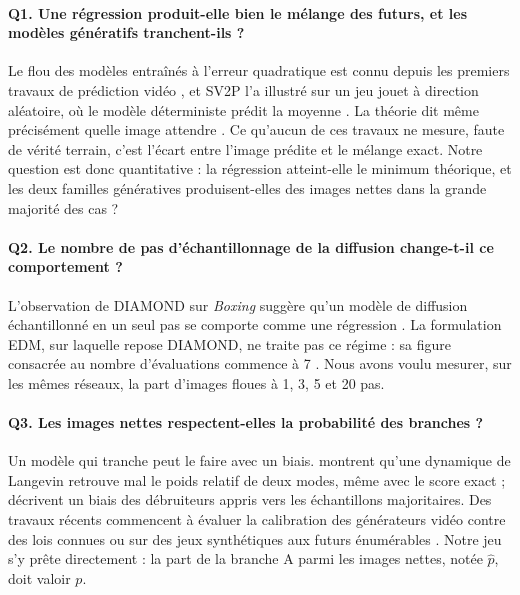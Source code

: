 \documentclass[a4paper, 11pt]{article}
\newcommand{\phat}{\hat p}
\newcommand{\Q}[1]{\textbf{Q#1}}
\begin{document}
\paragraph{\Q1. Une régression produit-elle bien le mélange des futurs, et les modèles génératifs tranchent-ils ?}
Le flou des modèles entraînés à l'erreur quadratique est connu depuis les premiers travaux de prédiction vidéo
\parencite{mathieu2016deep}, et SV2P l'a illustré sur un jeu jouet à direction aléatoire, où le modèle déterministe
prédit la moyenne \parencite{babaeizadeh2018sv2p}. La théorie dit même précisément quelle image attendre
\parencite{blau2018perception}. Ce qu'aucun de ces travaux ne mesure, faute de vérité terrain, c'est l'écart entre l'image
prédite et le mélange exact. Notre question est donc quantitative : la régression atteint-elle le minimum théorique, et
les deux familles génératives produisent-elles des images nettes dans la grande majorité des cas ?

\paragraph{\Q2. Le nombre de pas d'échantillonnage de la diffusion change-t-il ce comportement ?}
L'observation de DIAMOND sur \emph{Boxing} suggère qu'un modèle de diffusion échantillonné en un seul pas se comporte
comme une régression \parencite[§5.2]{alonso2024diamond}. La formulation EDM, sur laquelle repose DIAMOND, ne traite pas
ce régime : sa figure consacrée au nombre d'évaluations commence à 7 \parencite{karras2022edm}. Nous avons voulu mesurer, sur les mêmes réseaux, la part d'images floues à 1, 3, 5 et 20 pas.

\paragraph{\Q3. Les images nettes respectent-elles la probabilité des branches ?}
Un modèle qui tranche peut le faire avec un biais. \textcite[§3.2.2]{song2019generative} montrent qu'une dynamique de
Langevin retrouve mal le poids relatif de deux modes, même avec le score exact ; \textcite{um2024minority} décrivent un
biais des débruiteurs appris vers les échantillons majoritaires. Des travaux récents commencent à évaluer la calibration
des générateurs vidéo contre des lois connues \parencite{sadeghi2026calibench} ou sur des jeux synthétiques aux futurs
énumérables \parencite{porcher2026flowwm}. Notre jeu s'y prête directement : la part de la branche A parmi les images
nettes, notée $\phat$, doit valoir $p$.
\end{document}
